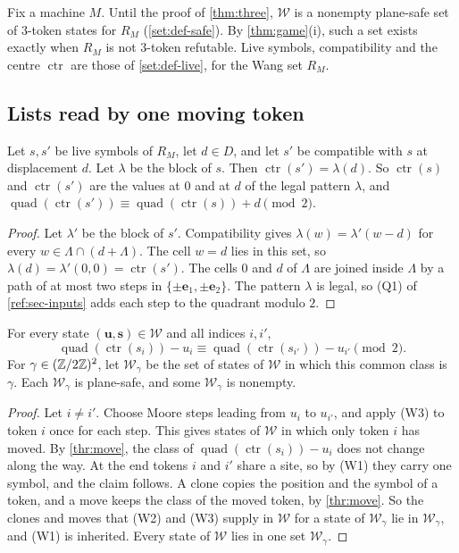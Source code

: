 Fix a machine $M$. Until the proof of \cref{thm:three}, $\mathcal W$ is a nonempty plane-safe set of $3$-token states for $R_M$ (\cref{set:def-safe}). By \cref{thm:game}(i), such a set exists exactly when $R_M$ is not $3$-token refutable. Live symbols, compatibility and the centre $\operatorname{ctr}$ are those of \cref{set:def-live}, for the Wang set $R_M$.

\subsection{Lists read by one moving token}\label{thr:sec-lists}

\begin{lemma}[Moves]\label{thr:move}
Let $s,s'$ be live symbols of $R_M$, let $d\in D$, and let $s'$ be compatible with $s$ at displacement $d$. Let $\lambda$ be the block of $s$. Then $\operatorname{ctr}(s')=\lambda(d)$. So $\operatorname{ctr}(s)$ and $\operatorname{ctr}(s')$ are the values at $0$ and at $d$ of the legal pattern $\lambda$, and $\operatorname{quad}(\operatorname{ctr}(s'))\equiv\operatorname{quad}(\operatorname{ctr}(s))+d\pmod2$.
\end{lemma}

\begin{proof}
Let $\lambda'$ be the block of $s'$. Compatibility gives $\lambda(w)=\lambda'(w-d)$ for every $w\in\Lambda\cap(d+\Lambda)$. The cell $w=d$ lies in this set, so $\lambda(d)=\lambda'(0,0)=\operatorname{ctr}(s')$. The cells $0$ and $d$ of $\Lambda$ are joined inside $\Lambda$ by a path of at most two steps in $\{\pm\mathbf e_1,\pm\mathbf e_2\}$. The pattern $\lambda$ is legal, so (Q1) of \cref{ref:sec-inputs} adds each step to the quadrant modulo $2$.
\end{proof}

\begin{lemma}\label{thr:phase}
For every state $(\mathbf u,\mathbf s)\in\mathcal W$ and all indices $i,i'$,
\[
\operatorname{quad}(\operatorname{ctr}(s_i))-u_i\equiv\operatorname{quad}(\operatorname{ctr}(s_{i'}))-u_{i'}\pmod2 .
\]
For $\gamma\in(\mathbb{Z}/2\mathbb{Z})^2$, let $\mathcal W_\gamma$ be the set of states of $\mathcal W$ in which this common class is $\gamma$. Each $\mathcal W_\gamma$ is plane-safe, and some $\mathcal W_\gamma$ is nonempty.
\end{lemma}

\begin{proof}
Let $i\ne i'$. Choose Moore steps leading from $u_i$ to $u_{i'}$, and apply (W3) to token $i$ once for each step. This gives states of $\mathcal W$ in which only token $i$ has moved. By \cref{thr:move}, the class of $\operatorname{quad}(\operatorname{ctr}(s_i))-u_i$ does not change along the way. At the end tokens $i$ and $i'$ share a site, so by (W1) they carry one symbol, and the claim follows. A clone copies the position and the symbol of a token, and a move keeps the class of the moved token, by \cref{thr:move}. So the clones and moves that (W2) and (W3) supply in $\mathcal W$ for a state of $\mathcal W_\gamma$ lie in $\mathcal W_\gamma$, and (W1) is inherited. Every state of $\mathcal W$ lies in one set $\mathcal W_\gamma$.
\end{proof}

